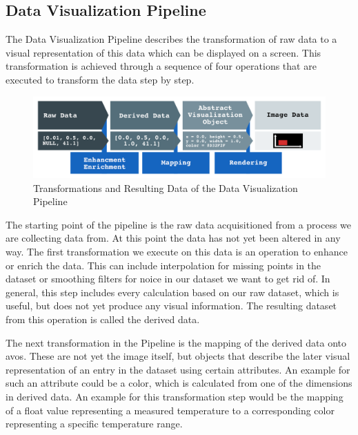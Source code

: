 \subsection{Data Visualization Pipeline}
\label{sec:fundamentals:charting:pipeline}

The Data Visualization Pipeline describes the transformation of raw data to a
visual representation of this data which can be displayed on a screen. This
transformation is achieved through a sequence of four operations that are
executed to transform the data step by step. 

\begin{figure}[h]
    \centering
    \includegraphics[width=15cm]{resources/img/VisualizationPipeline}
    \caption{Transformations and Resulting Data of the Data Visualization Pipeline}
    \label{fig:pipeline}
\end{figure}

The starting point of the pipeline is the raw data acquisitioned from a process
we are collecting data from. At this point the data has not yet been altered in
any way. The first transformation we execute on this data is an operation to
enhance or enrich the data. This can include interpolation for missing points in
the dataset or smoothing filters for noice in our dataset we want to get rid of.
In general, this step includes every calculation based on our raw dataset, which
is useful, but does not yet produce any visual information.  The resulting
dataset from this operation is called the derived data. 

The next transformation in the Pipeline is the mapping of the derived data onto
\glspl{avo}. These are not yet the image itself, but objects that describe the
later visual representation of an entry in the dataset using certain attributes.
An example for such an attribute could be a color, which is calculated from one
of the dimensions in derived data. An example for this transformation step would
be the mapping of a float value representing a measured temperature to a
corresponding color representing a specific temperature range.

